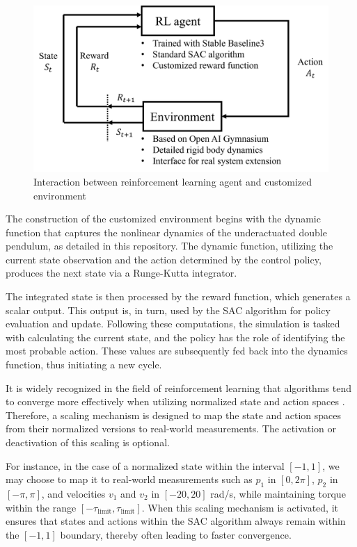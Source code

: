 \begin{figure}[htbp]
    \centering
    \includegraphics[width=0.8\linewidth]{figures/simulation_result/RL_interaction.png}
    \caption{Interaction between reinforcement learning agent and customized environment}
    \label{fig:RL_interaction}
\end{figure}

The construction of the customized environment begins with the dynamic function that captures the nonlinear dynamics of the underactuated double pendulum, as detailed in this repository\cite{2023_ram_wiebe_double_pendulum}. The dynamic function, utilizing the current state observation and the action determined by the control policy, produces the next state via a Runge-Kutta integrator.

The integrated state is then processed by the reward function, which generates a scalar output. This output is, in turn, used by the SAC algorithm for policy evaluation and update. Following these computations, the simulation is tasked with calculating the current state, and the policy has the role of identifying the most probable action. These values are subsequently fed back into the dynamics function, thus initiating a new cycle.

It is widely recognized in the field of reinforcement learning that algorithms tend to converge more effectively when utilizing normalized state and action spaces \cite{sutton2018reinforcement}. Therefore, a scaling mechanism is designed to map the state and action spaces from their normalized versions to real-world measurements. The activation or deactivation of this scaling is optional.

For instance, in the case of a normalized state within the interval $[-1,1]$, we may choose to map it to real-world measurements such as $p_1$ in $[0,2\pi]$, $p_2$ in $[-\pi,\pi]$, and velocities $v_1$ and $v_2$ in $[-20,20]$ rad/s, while maintaining torque within the range $[-\tau_{\text{limit}}, \tau_{\text{limit}}]$. When this scaling mechanism is activated, it ensures that states and actions within the SAC algorithm always remain within the $[-1,1]$ boundary, thereby often leading to faster convergence.

